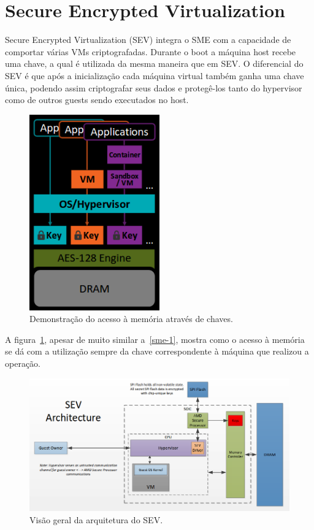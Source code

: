 \documentclass{report}
\begin{document}
\section{Secure Encrypted Virtualization}

Secure Encrypted Virtualization (SEV) integra o SME com a capacidade de
comportar várias VMs criptografadas. Durante o boot a máquina host recebe uma
chave, a qual é utilizada da mesma maneira que em SEV\@. O diferencial do SEV é
que após a inicialização cada máquina virtual também ganha uma chave única,
podendo assim criptografar seus dados e protegê-los tanto do hypervisor como de
outros guests sendo executados no host.

\begin{figure}[h]
    \centering
    \includegraphics[width=0.5\textwidth]{img/sev}
    \caption{Demonstração do acesso à memória através de chaves.}\label{sev}
\end{figure}

A figura~\ref{sev}, apesar de muito similar a~\ref{sme-1}, mostra como o acesso
à memória se dá com a utilização sempre da chave correspondente à máquina que
realizou a operação.


\begin{figure}[h]
    \centering
    \includegraphics[width=1\textwidth]{img/sev-architecture}
    \caption{Visão geral da arquitetura do SEV\@.}\label{sev-architecture}
\end{figure}
\end{document}
